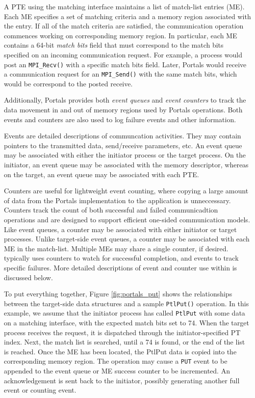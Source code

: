 A PTE using the matching interface maintains a list of match-list
entries (ME). Each ME specifies a set of matching criteria and a
memory region associated with the entry. If all of the match criteria
are satisfied, the communication operation commences working on
corresponding memory region. In particular, each ME contains a 64-bit
{\em match bits} field that must correspond to the match bits
specified on an incoming communication request. For example, a process
would post an {\tt MPI\_Recv()} with a specific match bits
field. Later, Portals would receive a communication request for an
{\tt MPI\_Send()} with the same match bits, which would be correspond
to the posted receive.

Additionally, Portals provides both {\em event queues} and {\em event
  counters} to track the data movement in and out of memory regions
used by Portals operations. Both events and counters are also used to
log failure events and other information. 

Events are detailed descriptions of communcation activities. They may
contain pointers to the transmitted data, send/receive parameters,
etc. An event queue may be associated with either the initiator
process or the target process.  On the initiator, an event queue may
be associated with the memory descriptor, whereas on the target,
an event queue may be associated with each PTE. 

Counters are useful for lightweight event counting, where copying a
large amount of data from the Portals implementation to the
application is unneccessary. Counters track the count of both
successful and failed communicadtion operations and are designed to
support efficient one-sided communication models. Like event queues, a
counter may be associated with either initiator or target
processes. Unlike target-side event queues, a counter may be
associated with each ME in the match-list. Multiple MEs may share a
single counter, if desired. \pdht typically uses counters to watch for
successful completion, and events to track specific failures. More
detailed descriptions of event and counter use within \pdht is
discussed below.

To put everything together, Figure \ref{fig:portals_put} shows the
relationships between the target-side data structures and a sample
{\tt PtlPut()} operation. In this example, we assume that the
initiator process has called {\tt PtlPut} with some data on a matching
interface, with the expected match bits set to 74. When the target
process receives the request, it is dispatched through the
initiator-specified PT index. Next, the match list is searched, until
a 74 is found, or the end of the list is reached. Once the ME has been
located, the PtlPut data is copied into the corresponding memory
region. The operation may cause a {\tt PUT} event to be appended to
the event queue or ME success counter to be incremented. An
acknowledgement is sent back to the initiator, possibly generating
another full event or counting event.




